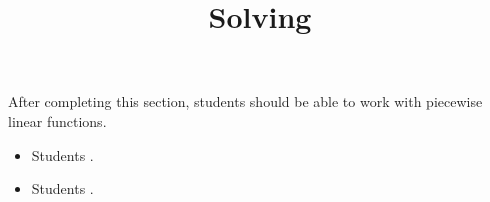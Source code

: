 \documentclass{ximera}
\title{Solving}
\begin{document}
\begin{abstract}
\end{abstract}

\maketitle

\begin{sectionOutcomes}

After completing this section, students should be able to work with piecewise linear functions. 

\begin{itemize}
\item Students .
\item Students .
\end{itemize}

\end{sectionOutcomes}
\end{document}
